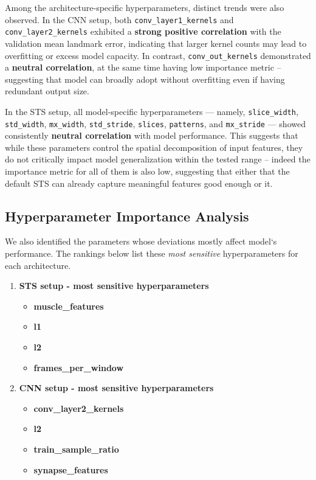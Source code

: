 Among the architecture-specific hyperparameters, distinct trends were also observed. 
In the CNN setup, both \texttt{conv\_layer1\_kernels} and \texttt{conv\_layer2\_kernels} exhibited a \textbf{strong positive correlation} with the validation mean landmark error, 
indicating that larger kernel counts may lead to overfitting or excess model capacity. 
In contrast, \texttt{conv\_out\_kernels} demonstrated a \textbf{neutral correlation}, at the same time having low importance metric -- suggesting that model can broadly adopt without overfitting even if having redundant output size.

In the STS setup, all model-specific hyperparameters — namely, 
\texttt{slice\_width}, \texttt{std\_width}, \texttt{mx\_width}, \texttt{std\_stride}, \texttt{slices}, \texttt{patterns}, and \texttt{mx\_stride} — showed consistently \textbf{neutral correlation} 
with model performance. This suggests that while these parameters control the spatial decomposition of input features, they do not critically impact model generalization within the tested range -- indeed the importance metric for all of them is also low, suggesting that either that the default STS can already capture meaningful features good enough or it.

\subsection{Hyperparameter Importance Analysis}
We also identified the parameters whose deviations mostly affect model`s performance.  
The rankings below list these \emph{most sensitive} hyperparameters for each architecture.

\begin{enumerate}
    \item \textbf{STS setup - most sensitive hyperparameters}
    \begin{itemize}
        \item \textbf{muscle\_features}
        \item \textbf{l1}
        \item \textbf{l2}
        \item \textbf{frames\_per\_window}
    \end{itemize}

    \item \textbf{CNN setup - most sensitive hyperparameters}
    \begin{itemize}
        \item \textbf{conv\_layer2\_kernels}
        \item \textbf{l2}
        \item \textbf{train\_sample\_ratio}
        \item \textbf{synapse\_features}
    \end{itemize}
\end{enumerate}

